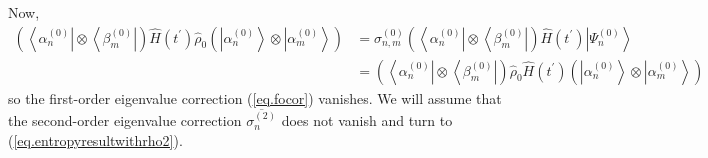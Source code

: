 \documentclass[11pt]{article}
\newcommand{\Od}[1]{\mathcal{O}{\left(#1\right)}}
\newcommand{\bra}[1]{\left\langle#1\right|}
\newcommand{\ket}[1]{\left|#1\right\rangle}
\newcommand{\op}[1]{\hat{#1}}
\theoremstyle{theorem}
\theoremstyle{remark}
\theoremstyle{step}
\theoremstyle{gap}
\begin{document}
Now,
\begin{align*}
\left(\bra{\alpha_n^{(0)}}\otimes\bra{\beta_m^{(0)}}\right) \op{H}(t^\prime) \op{\rho}_0 \left(\ket{\alpha_n^{(0)}}\otimes\ket{\alpha_m^{(0)}}\right) 
&= 
\sigma_{n,m}^{(0)} \left(\bra{\alpha_n^{(0)}}\otimes\bra{\beta_m^{(0)}}\right) \op{H}(t^\prime) \ket{\Psi_n^{(0)}} 
\\&=
 \left(\bra{\alpha_n^{(0)}}\otimes\bra{\beta_m^{(0)}}\right) \op{\rho}_0 \op{H}(t^\prime) \left(\ket{\alpha_n^{(0)}}\otimes\ket{\alpha_m^{(0)}}\right)
\end{align*}
so the first-order eigenvalue correction (\ref{eq.focor}) vanishes. We will assume that the second-order eigenvalue correction \(\overline{\sigma_n^{(2)}}\) does not vanish and turn to (\ref{eq.entropyresultwithrho2}).

%
\end{document}
